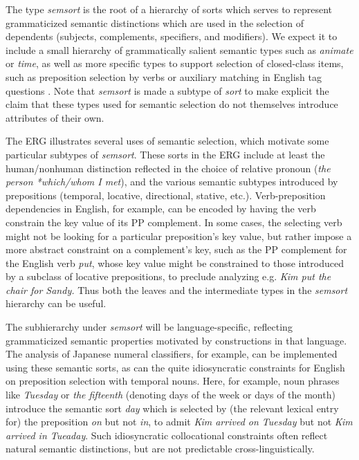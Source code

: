 \documentclass[12pt]{article}
\begin{document}
The type {\it semsort} is the root of a hierarchy of sorts which
serves to represent grammaticized semantic distinctions which are used
in the selection of dependents (subjects, complements, specifiers, and
modifiers).  We expect it to include a small hierarchy of
grammatically salient semantic types such as {\it animate} or {\it
time}, as well as more specific types to support selection of
closed-class items, such as preposition selection by verbs or
auxiliary matching in English tag questions \cite{Ben:Fli:99}.  Note
that {\it semsort} is made a subtype of {\it sort} to make explicit
the claim that these types used for semantic selection do not
themselves introduce attributes of their own.

The ERG illustrates several uses of semantic selection, which motivate
some particular subtypes of {\it semsort}.  These sorts in the ERG
include at least the human/nonhuman distinction reflected in the
choice of relative pronoun ({\it the person *which/whom I met}), and
the various semantic subtypes introduced by prepositions (temporal,
locative, directional, stative, etc.).  Verb-preposition dependencies
in English, for example, can be encoded by having the verb constrain
the {\sc key} value of its PP complement.  In some cases, the
selecting verb might not be looking for a particular preposition's
{\sc key} value, but rather impose a more abstract constraint on a
complement's key, such as the PP complement for the English verb {\it
put}, whose {\sc key} value might be constrained to those introduced
by a subclass of locative prepositions, to preclude analyzing
e.g. {\it *Kim put the chair for Sandy.}  Thus both the leaves and
the intermediate types in the {\it semsort} hierarchy can be useful.

The subhierarchy under {\it semsort} will be language-specific,
reflecting grammaticized semantic properties motivated by
constructions in that language.  The analysis of Japanese numeral
classifiers, for example, can be implemented using these semantic
sorts, as can the quite idiosyncratic constraints for English on
preposition selection with temporal nouns.  Here, for example, noun
phrases like {\it Tuesday} or {\it the fifteenth} (denoting days of
the week or days of the month) introduce the semantic sort {\it day}
which is selected by (the relevant lexical entry for) the preposition
{\it on} but not {\it in}, to admit {\it Kim arrived on Tuesday} but
not {\it *Kim arrived in Tueaday}.  Such idiosyncratic collocational
constraints often reflect natural semantic distinctions, but are not
predictable cross-linguistically.
\end{document}
